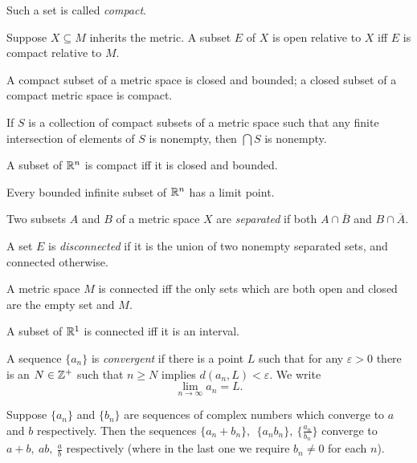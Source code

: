 \begin{defn}
  Such a set is called \emph{compact}.
\end{defn}
\begin{prop}
  Suppose $X\subseteq M$ inherits the metric. A subset $E$ of $X$ is open
  relative to $X$ iff $E$ is compact relative to $M$.
\end{prop}
\begin{prop}
  A compact subset of a metric space is closed and bounded; a closed subset of a compact
  metric space is compact.
\end{prop}
\begin{prop}
  If $S$ is a collection of compact subsets of a metric space such that any
  finite intersection of elements of $S$ is nonempty, then $\bigcap S$ is
  nonempty.
\end{prop}
\begin{thm}
  A subset of $\mathbb{R}^n$ is compact iff it is closed and bounded.
\end{thm}
\begin{thm}[Weierstrass]
  Every bounded infinite subset of $\mathbb{R}^n$ has a limit point.
\end{thm}
\begin{defn}
  Two subsets $A$ and $B$ of a metric space $X$ are \emph{separated} if both
  $A\cap\overline B$ and $B\cap\overline A$.

  A set $E$ is \emph{disconnected} if it is the union of two nonempty separated
  sets, and connected otherwise.
\end{defn}
\begin{prop}
  A metric space $M$ is connected iff the only sets which are both open and closed
  are the empty set and $M$.
\end{prop}
\begin{prop}
  A subset of $\mathbb{R}^1$ is connected iff it is an interval.
\end{prop}
\begin{defn}
  A sequence $\{a_n\}$ is \emph{convergent} if there is a point $L$ such that
  for any $\varepsilon>0$ there is an $N\in\mathbb{Z}^+$ such that $n\ge N$ implies
  $d(a_n,L)<\varepsilon$. We write \[\lim_{n\to\infty} a_n=L.\]
\end{defn}
\begin{prop}
  Suppose $\{a_n\}$ and $\{b_n\}$ are sequences of complex numbers which
  converge to $a$ and $b$ respectively. Then the sequences $\{a_n+b_n\},\
  \ \{a_n b_n\},\ \{\frac{a_n}{b_n}\}$ converge to $a+b,\ ab,\ \frac ab$
  respectively (where in the last one we require $b_n\ne 0$ for each $n$).
\end{prop}
